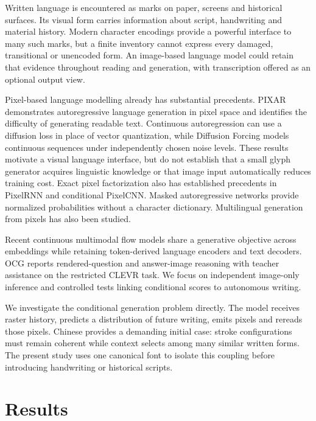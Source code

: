 Written language is encountered as marks on paper, screens and historical
surfaces. Its visual form carries information about script, handwriting and
material history. Modern character encodings provide a powerful interface to
many such marks, but a finite inventory cannot express every damaged,
transitional or unencoded form. An image-based language model could retain
that evidence throughout reading and generation, with transcription offered
as an optional output view.

Pixel-based language modelling already has substantial precedents.
PIXAR demonstrates autoregressive language generation in pixel space and
identifies the difficulty of generating readable text\cite{pixar}. Continuous
autoregression can use a diffusion loss in place of vector quantization\cite{mar},
while Diffusion Forcing models continuous sequences under independently chosen
noise levels\cite{forcing}. These results motivate a visual language interface,
but do not establish that a small glyph generator acquires linguistic
knowledge or that image input automatically reduces training cost.
Exact pixel factorization also has established precedents in PixelRNN and
conditional PixelCNN\cite{pixelrnn,pixelcnn}. Masked autoregressive networks
provide normalized probabilities without a character dictionary\cite{made}.
Multilingual generation from pixels has also been studied\cite{mixar}.

Recent continuous multimodal flow models share a generative objective across
embeddings while retaining token-derived language encoders and text
decoders\cite{multimodalflow}. OCG reports rendered-question and answer-image
reasoning with teacher assistance on the restricted CLEVR task\cite{ocg}.
We focus on independent image-only inference and controlled tests linking
conditional scores to autonomous writing.

We investigate the conditional generation problem directly. The model
receives raster history, predicts a distribution of future writing, emits
pixels and rereads those pixels. Chinese provides a demanding initial case:
stroke configurations must remain coherent while context selects among many
similar written forms. The present study uses one canonical font to isolate
this coupling before introducing handwriting or historical scripts.

\section*{Results}
